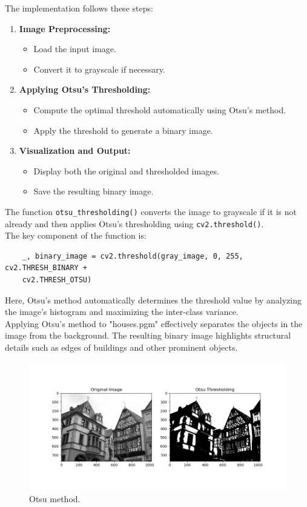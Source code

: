The implementation follows these steps:
\begin{enumerate}
    \item \textbf{Image Preprocessing:} 
    \begin{itemize}
        \item Load the input image.
        \item Convert it to grayscale if necessary.
    \end{itemize}
    \item \textbf{Applying Otsu’s Thresholding:}
    \begin{itemize}
        \item Compute the optimal threshold automatically using Otsu’s method.
        \item Apply the threshold to generate a binary image.
    \end{itemize}
    \item \textbf{Visualization and Output:}
    \begin{itemize}
        \item Display both the original and thresholded images.
        \item Save the resulting binary image.
    \end{itemize}
\end{enumerate}

The function \texttt{otsu\_thresholding()} converts the image to grayscale if it is not already and then applies Otsu’s thresholding using \texttt{cv2.threshold()}. \\
The key component of the function is:
\begin{verbatim}
    _, binary_image = cv2.threshold(gray_image, 0, 255, cv2.THRESH_BINARY +
    cv2.THRESH_OTSU)
\end{verbatim}

Here, Otsu’s method automatically determines the threshold value by analyzing the image’s histogram and maximizing the inter-class variance. \\
Applying Otsu’s method to "houses.pgm" effectively separates the objects in the image from the background. The resulting binary image highlights structural details such as edges of buildings and other prominent objects.
\begin{figure}[H]
    \centering
    \includegraphics[width=\linewidth]{../Images/otsu_thresholding.png}
    \caption{Otsu method.}
    \label{fig:enter-label}
\end{figure}

